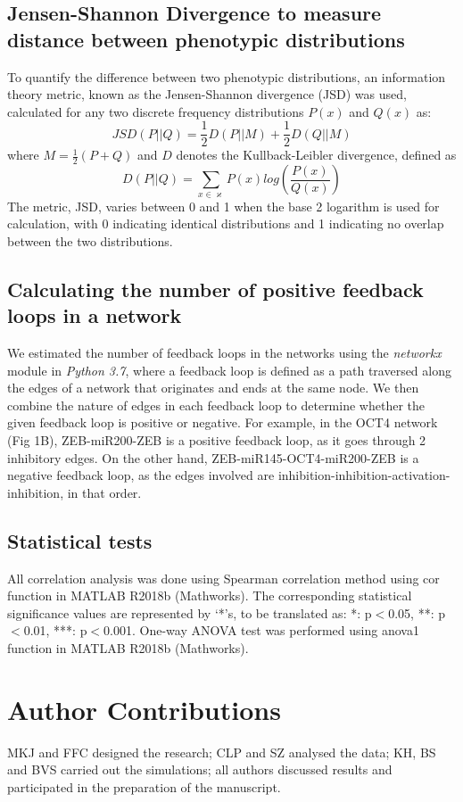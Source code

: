 \documentclass[preprint,review,12pt]{elsarticle}
\begin{document}
	\subsection{Jensen-Shannon Divergence to measure distance between phenotypic distributions}
	To quantify the difference between two phenotypic distributions, an information theory metric, known as the Jensen-Shannon divergence (JSD) \cite{Lin1991} was used, calculated for any two discrete frequency distributions $P(x)$ and $Q(x)$ as:
	$$JSD (P||Q) = \frac{1}{2} D(P||M) + \frac{1}{2} D(Q||M)$$
	where $M = \frac{1}{2} (P + Q)$ and $D$ denotes the Kullback-Leibler divergence, defined as 
	$$D(P||Q) = \sum\limits_{x\in \varkappa} P(x) log(\frac{P(x)}{Q(x)})$$
	The metric, JSD, varies between 0 and 1 when the base 2 logarithm is used for calculation, with 0 indicating identical distributions and 1 indicating no overlap between the two distributions.
	
	
	\subsection{Calculating the number of positive feedback loops in a network}
	We estimated the number of feedback loops in the networks using the \textit{networkx} module in \textit{Python 3.7}, where a feedback loop is defined as a path traversed along the edges of a network that originates and ends at the same node. We then combine the nature of edges in each feedback loop to determine whether the given feedback loop is positive or negative. For example, in the OCT4 network (Fig 1B), ZEB-miR200-ZEB is a positive feedback loop, as it goes through 2 inhibitory edges. On the other hand, ZEB-miR145-OCT4-miR200-ZEB is a negative feedback loop, as the edges involved are inhibition-inhibition-activation-inhibition, in that order.
	
	\subsection{Statistical tests}
	All correlation analysis was done using Spearman correlation method using cor function in MATLAB R2018b (Mathworks). The corresponding statistical significance values are represented by ‘*’s, to be translated as: *: p$<$0.05, **: p$<$0.01, ***: p$<$0.001. One-way ANOVA test was performed using anova1 function in MATLAB R2018b (Mathworks). 
	
	\section{Author Contributions}
	MKJ and FFC designed the research; CLP and SZ analysed the data; KH, BS and BVS carried out the simulations; all authors discussed results and participated in the preparation of the manuscript. 
	
\end{document}
